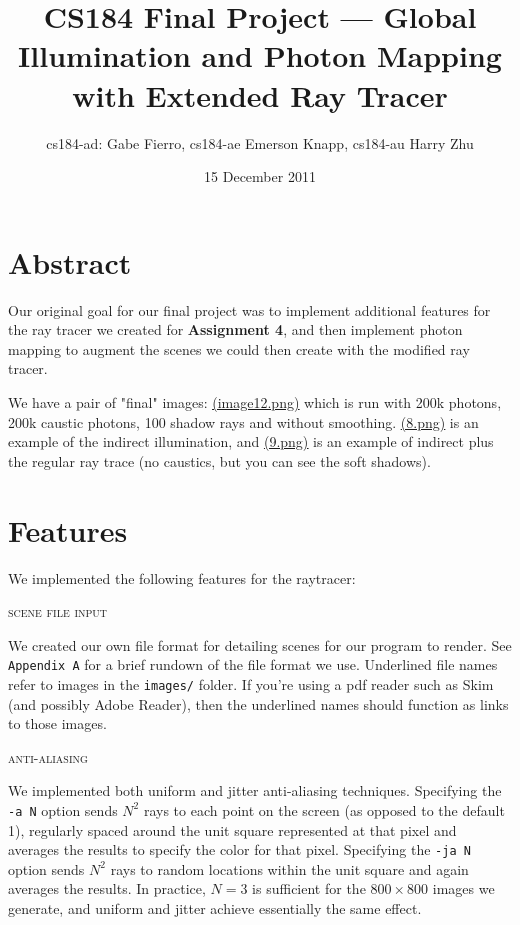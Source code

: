 \documentclass{article}
\title{CS184 Final Project --- Global Illumination and Photon Mapping with Extended Ray Tracer}
\author{cs184-ad: Gabe Fierro, cs184-ae Emerson Knapp, cs184-au Harry Zhu}
\date{15 December 2011}
\begin{document}
\maketitle

\section*{Abstract}

Our original goal for our final project was to implement additional features for the ray tracer we created for {\bf Assignment 4}, and then implement photon mapping to augment the scenes we could then create with the modified ray tracer. 

We have a pair of "final" images: \href{run://images/image12.png}{\underline{(image12.png)}} which is run with 200k photons, 200k caustic photons, 100 shadow rays and without smoothing. \href{run://images/8.png}{\underline{(8.png)}} is an example of the indirect illumination, and \href{run://images/9.png}{\underline{(9.png)}} is an example of indirect plus the regular ray trace (no caustics, but you can see the soft shadows).

\tableofcontents

\section{Features} %
\label{sec:features}

We implemented the following features for the raytracer:

\begin{center}\textsc{scene file input}\end{center} 
We created our own file format for detailing scenes for our program to render. See \verb+Appendix A+ for a brief rundown of the file format we use. Underlined file names refer to images in the \verb+images/+ folder. If you're using a pdf reader such as Skim (and possibly Adobe Reader), then the underlined names should function as links to those images.

\begin{center}\textsc{anti-aliasing}\end{center} 
We implemented both uniform and jitter anti-aliasing techniques. Specifying the \verb+-a N+ option sends $N^2$ rays to each point on the screen (as opposed to the default 1), regularly spaced around the unit square represented at that pixel and averages the results to specify the color for that pixel. Specifying the \verb+-ja N+ option sends $N^2$ rays to random locations within the unit square and again averages the results. In practice, $N=3$ is sufficient for the $800\times 800$ images we generate, and uniform and jitter achieve essentially the same effect.
\end{document}
